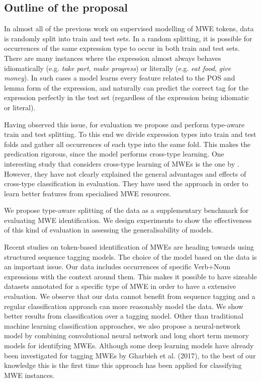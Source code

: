 \documentclass[output=paper
,modfonts
,nonflat]{langsci/langscibook}
\begin{document}
\subsection{Outline of the proposal}
\label{s:obs}

In almost all of the previous work on supervised modelling of MWE tokens, data is randomly split into train and test sets. %
In a random splitting, it is possible for occurrences of the same expression type to occur in both train and test sets. There are many instances where the expression almost always behaves idiomatically (e.g. \textit{take part}, \textit{make progress}) or literally (e.g. \textit{eat food}, \textit{give money}). In such cases a model learns every feature related to the POS and lemma form of the expression, and naturally can predict the correct tag for the expression perfectly in the test set (regardless of the expression being idiomatic or literal).  

Having observed this issue, for evaluation we propose and perform type-aware train and test splitting. To this end we divide expression types into train and test folds and gather all occurrences of each type into the same fold. This makes the predication rigorous, since the model performs cross-type learning.
One interesting study that considers cross-type learning of MWEs is the one by \cite{Fothergill2012}. However, they have not clearly explained %
the general advantages and effects of cross-type classification in evaluation. They have used the approach in order to learn better features from specialised MWE resources. 

We propose type-aware splitting of the data as a supplementary benchmark for evaluating MWE identification. We design experiments to show the effectiveness of this kind of evaluation in assessing the generalisability of models.

Recent studies on token-based identification of MWEs are heading towards using structured sequence tagging models. The choice of the model based on the data is an important issue. Our data includes occurrences of specific Verb+Noun expressions with the context around them. This makes it possible to have sizeable datasets annotated for a specific type of MWE in order to have a extensive evaluation.  
We observe that our data cannot benefit from sequence tagging and a regular classification approach can more reasonably model the data. We show better results from classification over a tagging model. 
Other than traditional machine learning classification approaches, we also propose a neural-network model by combining convolutional neural network and long short term memory models for identifying MWEs. Although some deep learning models have already been investigated for tagging MWEs by Gharbieh et al. (2017), to the best of our knowledge this is the first time this approach has been applied for classifying MWE instances. 
\end{document}
